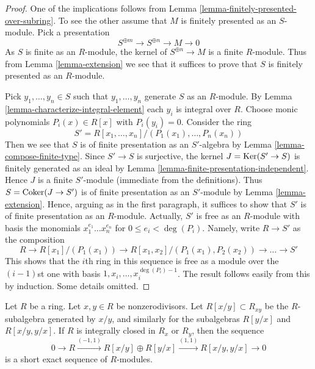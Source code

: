 \begin{proof}
One of the implications follows from
Lemma \ref{lemma-finitely-presented-over-subring}.
To see the other assume that $M$ is finitely presented as an $S$-module.
Pick a presentation
$$
S^{\oplus m} \longrightarrow
S^{\oplus n} \longrightarrow
M \longrightarrow 0
$$
As $S$ is finite as an $R$-module, the kernel of
$S^{\oplus n} \to M$ is a finite $R$-module. Thus from
Lemma \ref{lemma-extension}
we see that it suffices to prove that $S$ is finitely presented as an
$R$-module.

\medskip\noindent
Pick $y_1, \ldots, y_n \in S$ such that $y_1, \ldots, y_n$ generate $S$
as an $R$-module. By Lemma \ref{lemma-characterize-integral-element}
each $y_i$ is integral over $R$. Choose monic polynomials
$P_i(x) \in R[x]$ with $P_i(y_i) = 0$. Consider the ring
$$
S' = R[x_1, \ldots, x_n]/(P_1(x_1), \ldots, P_n(x_n))
$$
Then we see that $S$ is of finite presentation as an $S'$-algebra
by Lemma \ref{lemma-compose-finite-type}. Since $S' \to S$ is surjective,
the kernel $J = \mathop{\mathrm{Ker}}(S' \to S)$ is finitely generated as an ideal by
Lemma \ref{lemma-finite-presentation-independent}. Hence $J$ is a finite
$S'$-module (immediate from the definitions).
Thus $S = \mathop{\mathrm{Coker}}(J \to S')$ is  of finite presentation as an $S'$-module
by Lemma \ref{lemma-extension}.
Hence, arguing as in the first paragraph, it suffices to show that $S'$ is
of finite presentation as an $R$-module. Actually, $S'$ is free as an
$R$-module with basis the monomials $x_1^{e_1} \ldots x_n^{e_n}$
for $0 \leq e_i < \deg(P_i)$. Namely, write $R \to S'$ as the composition
$$
R \to R[x_1]/(P_1(x_1)) \to R[x_1, x_2]/(P_1(x_1), P_2(x_2)) \to
\ldots \to S'
$$
This shows that the $i$th ring in this sequence is free as a module over the
$(i - 1)$st one with basis $1, x_i, \ldots, x_i^{\deg(P_i) - 1}$. The result
follows easily from this by induction. Some details omitted.
\end{proof}

\begin{lemma}
\label{lemma-silly-normal}
Let $R$ be a ring. Let $x, y \in R$ be nonzerodivisors.
Let $R[x/y] \subset R_{xy}$ be the $R$-subalgebra generated
by $x/y$, and similarly for the subalgebras $R[y/x]$ and $R[x/y, y/x]$.
If $R$ is integrally closed in $R_x$ or $R_y$, then the sequence
$$
0 \to R \xrightarrow{(-1, 1)} R[x/y] \oplus R[y/x] \xrightarrow{(1, 1)}
R[x/y, y/x] \to 0
$$
is a short exact sequence of $R$-modules.
\end{lemma}

